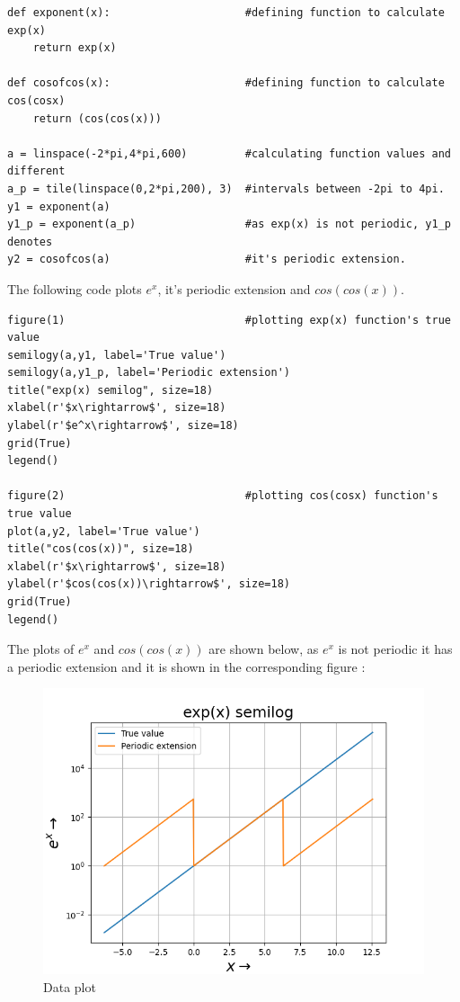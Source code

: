 \documentclass[11pt, a4paper]{article}
\begin{document}
\begin{verbatim}
def exponent(x):                     #defining function to calculate exp(x)
    return exp(x)

def cosofcos(x):                     #defining function to calculate cos(cosx)
    return (cos(cos(x)))
	
a = linspace(-2*pi,4*pi,600)         #calculating function values and different
a_p = tile(linspace(0,2*pi,200), 3)  #intervals between -2pi to 4pi.
y1 = exponent(a)                                                                                                     
y1_p = exponent(a_p)                 #as exp(x) is not periodic, y1_p denotes
y2 = cosofcos(a)                     #it's periodic extension.
\end{verbatim}
The following code plots $e^{x}$, it's periodic extension and $cos(cos(x))$.
\begin{verbatim}
figure(1)                            #plotting exp(x) function's true value
semilogy(a,y1, label='True value')
semilogy(a,y1_p, label='Periodic extension')
title("exp(x) semilog", size=18)
xlabel(r'$x\rightarrow$', size=18)
ylabel(r'$e^x\rightarrow$', size=18)
grid(True)
legend()

figure(2)                            #plotting cos(cosx) function's true value
plot(a,y2, label='True value')
title("cos(cos(x))", size=18)
xlabel(r'$x\rightarrow$', size=18)
ylabel(r'$cos(cos(x))\rightarrow$', size=18)
grid(True)
legend()
\end{verbatim}
The plots of $e^{x}$ and $cos(cos(x))$ are shown below, as $e^{x}$ is not periodic it has a periodic extension and it is shown in the corresponding figure :
   \begin{figure}[!tbh]
   	\centering
   	\includegraphics[scale=0.6]{Figure_1a.png}   
   	\caption{Data plot}
   	\label{fig:sample}
   \end{figure} 
   
\end{document}
